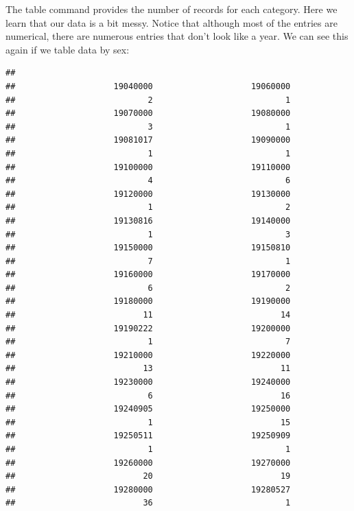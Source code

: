 \documentclass[]{book}
\newenvironment{Shaded}{\begin{snugshade}}{\end{snugshade}}
\newcommand{\KeywordTok}[1]{\textcolor[rgb]{0.13,0.29,0.53}{\textbf{{#1}}}}
\newcommand{\CommentTok}[1]{\textcolor[rgb]{0.56,0.35,0.01}{\textit{{#1}}}}
\newcommand{\NormalTok}[1]{{#1}}
\begin{document}
The table command provides the number of records for each category. Here
we learn that our data is a bit messy. Notice that although most of the
entries are numerical, there are numerous entries that don't look like a
year. We can see this again if we table data by sex:

\begin{Shaded}
\end{Shaded}

\begin{verbatim}
## 
##                    19040000                    19060000 
##                           2                           1 
##                    19070000                    19080000 
##                           3                           1 
##                    19081017                    19090000 
##                           1                           1 
##                    19100000                    19110000 
##                           4                           6 
##                    19120000                    19130000 
##                           1                           2 
##                    19130816                    19140000 
##                           1                           3 
##                    19150000                    19150810 
##                           7                           1 
##                    19160000                    19170000 
##                           6                           2 
##                    19180000                    19190000 
##                          11                          14 
##                    19190222                    19200000 
##                           1                           7 
##                    19210000                    19220000 
##                          13                          11 
##                    19230000                    19240000 
##                           6                          16 
##                    19240905                    19250000 
##                           1                          15 
##                    19250511                    19250909 
##                           1                           1 
##                    19260000                    19270000 
##                          20                          19 
##                    19280000                    19280527 
##                          36                           1 

\end{verbatim}
\end{document}
